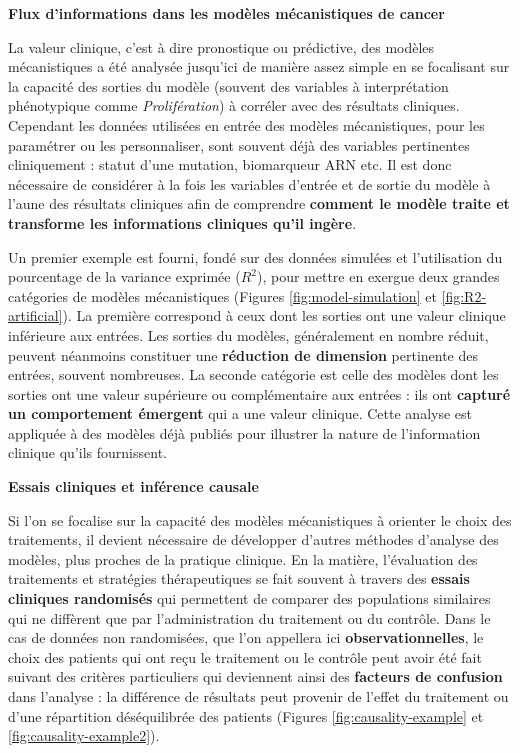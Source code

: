 \documentclass[a4paper,12pt,twoside,onecolumn,openright,final,oldfontcommands]{memoir}
\begin{document}
\textbf{Flux d'informations dans les modèles mécanistiques de cancer}

La valeur clinique, c'est à dire pronostique ou prédictive, des modèles
mécanistiques a été analysée jusqu'ici de manière assez simple en se
focalisant sur la capacité des sorties du modèle (souvent des variables
à interprétation phénotypique comme \emph{Prolifération}) à corréler
avec des résultats cliniques. Cependant les données utilisées en entrée
des modèles mécanistiques, pour les paramétrer ou les personnaliser,
sont souvent déjà des variables pertinentes cliniquement : statut d'une
mutation, biomarqueur ARN etc. Il est donc nécessaire de considérer à la
fois les variables d'entrée et de sortie du modèle à l'aune des
résultats cliniques afin de comprendre \textbf{comment le modèle traite
et transforme les informations cliniques qu'il ingère}.

Un premier exemple est fourni, fondé sur des données simulées et
l'utilisation du pourcentage de la variance exprimée (\(R^2\)), pour
mettre en exergue deux grandes catégories de modèles mécanistiques
(Figures \ref{fig:model-simulation} et \ref{fig:R2-artificial}). La
première correspond à ceux dont les sorties ont une valeur clinique
inférieure aux entrées. Les sorties du modèles, généralement en nombre
réduit, peuvent néanmoins constituer une \textbf{réduction de dimension}
pertinente des entrées, souvent nombreuses. La seconde catégorie est
celle des modèles dont les sorties ont une valeur supérieure ou
complémentaire aux entrées : ils ont \textbf{capturé un comportement
émergent} qui a une valeur clinique. Cette analyse est appliquée à des
modèles déjà publiés pour illustrer la nature de l'information clinique
qu'ils fournissent.

\textbf{Essais cliniques et inférence causale}

Si l'on se focalise sur la capacité des modèles mécanistiques à orienter
le choix des traitements, il devient nécessaire de développer d'autres
méthodes d'analyse des modèles, plus proches de la pratique clinique. En
la matière, l'évaluation des traitements et stratégies thérapeutiques se
fait souvent à travers des \textbf{essais cliniques randomisés} qui
permettent de comparer des populations similaires qui ne diffèrent que
par l'administration du traitement ou du contrôle. Dans le cas de
données non randomisées, que l'on appellera ici
\textbf{observationnelles}, le choix des patients qui ont reçu le
traitement ou le contrôle peut avoir été fait suivant des critères
particuliers qui deviennent ainsi des \textbf{facteurs de confusion}
dans l'analyse : la différence de résultats peut provenir de l'effet du
traitement ou d'une répartition déséquilibrée des patients (Figures
\ref{fig:causality-example} et \ref{fig:causality-example2}).
\end{document}
